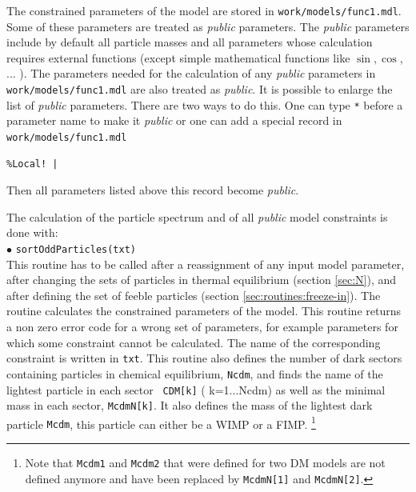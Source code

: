 \documentclass[12pt,a4paper]{article}
\begin{document}
The constrained parameters of the model are stored in \verb|work/models/func1.mdl|. Some of
these parameters are treated as {\it public} parameters. The {\it public} parameters include 
by default all particle masses 
and all parameters  whose calculation requires external functions (except simple
mathematical functions like $\sin,\cos$, ... ). The parameters needed for the calculation of any 
{\it public} parameters in  \verb|work/models/func1.mdl|
are also treated as {\it public}. 
It is possible to enlarge the list of {\it public} parameters. There are two ways to do this. 
One can type \verb|*| before a parameter name to make it {\it public} or one 
can add a  special record in \verb|work/models/func1.mdl|
\begin{verbatim}
%Local! |   
\end{verbatim}
Then all parameters listed above this record  become {\it public}. 


The calculation of the particle spectrum and of all  {\it public} model constraints 
is  done with:\\[2mm]
 $\bullet$ \verb|sortOddParticles(txt)|\\
This routine has to be called after a reassignment of any input model parameter,
after changing the  sets of particles in  thermal equilibrium (section \ref{sec:N}), and after defining the set of
feeble particles (section \ref{sec:routines:freeze-in}). The routine calculates the
constrained parameters of the model. This routine returns a non zero error code for a
wrong set of parameters, for example parameters  for which some
constraint cannot be calculated. The name of the corresponding constraint is
written in \verb|txt|. 
This routine also  defines the number of dark  sectors containing particles in chemical equilibrium, 
{\tt Ncdm},  and finds the  name  of the lightest particle in each sector {\tt
CDM[k]} ( k=1...Ncdm) as well as  the minimal mass  in each sector, {\tt McdmN[k]}. It also defines  the
 mass of the lightest dark particle {\tt Mcdm}, this particle can either be a WIMP or a FIMP. {\footnote{Note that {\tt Mcdm1} and {\tt Mcdm2} that were defined for two DM models are not defined anymore and have been replaced by {\tt McdmN[1]} and  {\tt McdmN[2]}. }}
  
\end{document}
